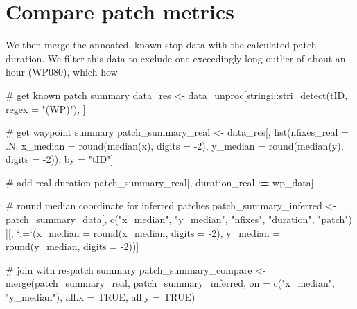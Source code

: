 \documentclass[]{scrreprt}
\newenvironment{Shaded}{}{}
\newcommand{\CommentTok}[1]{\textcolor[rgb]{0.00,0.50,0.00}{#1}}
\newcommand{\DataTypeTok}[1]{#1}
\newcommand{\DecValTok}[1]{#1}
\newcommand{\ErrorTok}[1]{\textcolor[rgb]{1.00,0.00,0.00}{\textbf{#1}}}
\newcommand{\KeywordTok}[1]{\textcolor[rgb]{0.00,0.00,1.00}{#1}}
\newcommand{\NormalTok}[1]{#1}
\newcommand{\OperatorTok}[1]{#1}
\newcommand{\OtherTok}[1]{\textcolor[rgb]{1.00,0.25,0.00}{#1}}
\newcommand{\StringTok}[1]{\textcolor[rgb]{0.00,0.50,0.50}{#1}}
\begin{document}
\hypertarget{compare-patch-metrics}{%
\section{Compare patch metrics}\label{compare-patch-metrics}}

We then merge the annoated, known stop data with the calculated patch duration.
We filter this data to exclude one exceedingly long outlier of about an hour (WP080), which how

\begin{Shaded}
\begin{Highlighting}[]
\CommentTok{# get known patch summary}
\NormalTok{data_res <-}\StringTok{ }\NormalTok{data_unproc[stringi}\OperatorTok{::}\KeywordTok{stri_detect}\NormalTok{(tID, }\DataTypeTok{regex =} \StringTok{"(WP)"}\NormalTok{), ]}

\CommentTok{# get waypoint summary}
\NormalTok{patch_summary_real <-}\StringTok{ }\NormalTok{data_res[, }\KeywordTok{list}\NormalTok{(}\DataTypeTok{nfixes_real =}\NormalTok{ .N,}
                                      \DataTypeTok{x_median =} \KeywordTok{round}\NormalTok{(}\KeywordTok{median}\NormalTok{(x), }\DataTypeTok{digits =} \DecValTok{-2}\NormalTok{),}
                                      \DataTypeTok{y_median =} \KeywordTok{round}\NormalTok{(}\KeywordTok{median}\NormalTok{(y), }\DataTypeTok{digits =} \DecValTok{-2}\NormalTok{)), }
\NormalTok{                               by =}\StringTok{ "tID"}\NormalTok{]}

\CommentTok{# add real duration}
\NormalTok{patch_summary_real[, duration_real }\OperatorTok{:}\ErrorTok{=}\StringTok{ }\NormalTok{wp_data]}

\CommentTok{# round median coordinate for inferred patches}
\NormalTok{patch_summary_inferred <-}\StringTok{ }
\StringTok{  }\NormalTok{patch_summary_data[, }
                     \KeywordTok{c}\NormalTok{(}\StringTok{"x_median"}\NormalTok{, }\StringTok{"y_median"}\NormalTok{, }
                       \StringTok{"nfixes"}\NormalTok{, }\StringTok{"duration"}\NormalTok{, }\StringTok{"patch"}\NormalTok{)}
\NormalTok{                     ][, }\StringTok{`}\DataTypeTok{:=}\StringTok{`}\NormalTok{(}\DataTypeTok{x_median =} \KeywordTok{round}\NormalTok{(x_median, }\DataTypeTok{digits =} \DecValTok{-2}\NormalTok{),}
                              \DataTypeTok{y_median =} \KeywordTok{round}\NormalTok{(y_median, }\DataTypeTok{digits =} \DecValTok{-2}\NormalTok{))]}

\CommentTok{# join with respatch summary}
\NormalTok{patch_summary_compare <-}\StringTok{ }
\StringTok{  }\KeywordTok{merge}\NormalTok{(patch_summary_real,}
\NormalTok{        patch_summary_inferred, }
        \DataTypeTok{on =} \KeywordTok{c}\NormalTok{(}\StringTok{"x_median"}\NormalTok{, }\StringTok{"y_median"}\NormalTok{),}
        \DataTypeTok{all.x =} \OtherTok{TRUE}\NormalTok{, }\DataTypeTok{all.y =} \OtherTok{TRUE}\NormalTok{)}


\end{Highlighting}
\end{Shaded}
\end{document}
